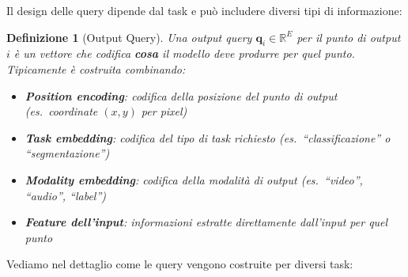 \documentclass[12pt,a4paper]{article}
\newtheorem{definition}[theorem]{Definizione}
\begin{document}
Il design delle query dipende dal task e pu\`o includere diversi tipi di informazione:

\begin{definition}[Output Query]
Una output query $\mathbf{q}_i \in \mathbb{R}^E$ per il punto di output $i$ \`e un vettore che codifica \textbf{cosa} il modello deve produrre per quel punto. Tipicamente \`e costruita combinando:
\begin{itemize}
    \item \textbf{Position encoding}: codifica della posizione del punto di output (es.\ coordinate $(x,y)$ per pixel)
    \item \textbf{Task embedding}: codifica del tipo di task richiesto (es.\ ``classificazione'' o ``segmentazione'')
    \item \textbf{Modality embedding}: codifica della modalit\`a di output (es.\ ``video'', ``audio'', ``label'')
    \item \textbf{Feature dell'input}: informazioni estratte direttamente dall'input per quel punto
\end{itemize}
\end{definition}

Vediamo nel dettaglio come le query vengono costruite per diversi task:
\end{document}

